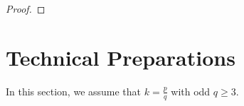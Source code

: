 \documentclass[12pt]{amsart}
\theoremstyle{plain}
\theoremstyle{definition}
\begin{document}
\begin{proof}
	\end{proof}
	

	
	
	\section{Technical Preparations}\label{sec3}
	In this section, we assume that $k=\frac{p}{q}$ with odd $q\geq 3$. 
	
\end{document}
